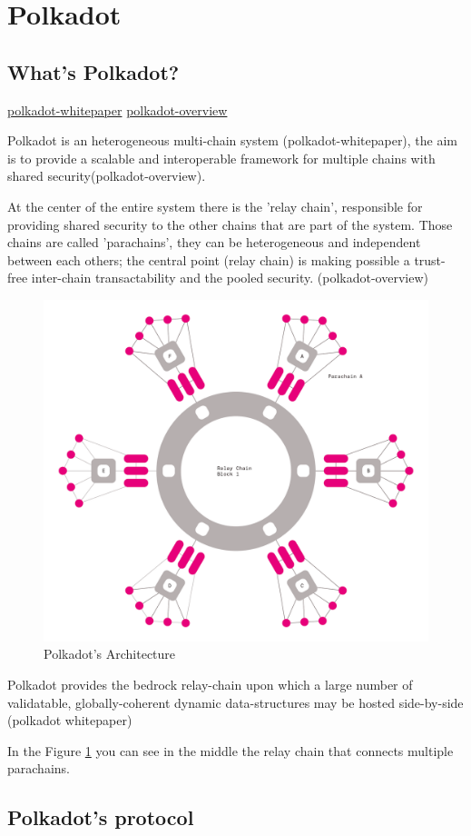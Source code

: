 \documentclass[../main.tex]{subfiles}
\begin{document}
\section{Polkadot}
\subsection{What's Polkadot?}
\href{https://assets.polkadot.network/Polkadot-whitepaper.pdf}{polkadot-whitepaper}
\href{https://arxiv.org/pdf/2005.13456.pdf}{polkadot-overview}

Polkadot is an heterogeneous multi-chain system (polkadot-whitepaper), the aim is to provide a scalable and interoperable framework for multiple chains with shared security(polkadot-overview).

At the center of the entire system there is the 'relay chain', responsible for providing shared security to the other chains that are part of the system. Those chains are called 'parachains', they can be heterogeneous and independent between each others; the central point (relay chain) is making possible a trust-free inter-chain transactability and the pooled security. (polkadot-overview)

\begin{figure}
  \centering
  \includegraphics[width=0.4\linewidth]{polkadot_architecture.png}
  \caption{Polkadot's Architecture}
  \label{fig:polkadot_arch}
\end{figure}

Polkadot provides the bedrock relay-chain upon which a large number of validatable, globally-coherent dynamic data-structures may be hosted side-by-side (polkadot whitepaper)

In the Figure \ref{fig:polkadot_arch} you can see in the middle the relay chain that connects multiple parachains.

\subsection{Polkadot's protocol}
\end{document}
